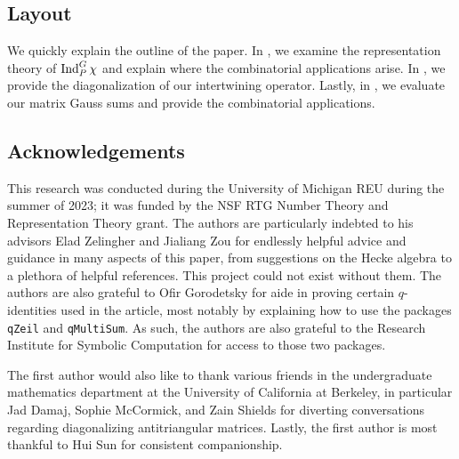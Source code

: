 \documentclass{amsart}
\begin{document}
\subsection{Layout}
We quickly explain the outline of the paper. In , we examine the representation theory of $\operatorname{Ind}_P^G\chi$ and explain where the combinatorial applications arise. In , we provide the diagonalization of our intertwining operator. Lastly, in , we evaluate our matrix Gauss sums and provide the combinatorial applications.

\subsection{Acknowledgements}
This research was conducted during the University of Michigan REU during the summer of 2023; it was funded by the NSF RTG Number Theory and Representation Theory grant. The authors are particularly indebted to his advisors Elad Zelingher and Jialiang Zou for endlessly helpful advice and guidance in many aspects of this paper, from suggestions on the Hecke algebra to a plethora of helpful references. This project could not exist without them. The authors are also grateful to Ofir Gorodetsky for aide in proving certain $q$-identities used in the article, most notably by explaining how to use the packages \texttt{qZeil} and \texttt{qMultiSum}. As such, the authors are also grateful to the Research Institute for Symbolic Computation for access to those two packages.

The first author would also like to thank various friends in the undergraduate mathematics department at the University of California at Berkeley, in particular Jad Damaj, Sophie McCormick, and Zain Shields for diverting conversations regarding diagonalizing antitriangular matrices. Lastly, the first author is most thankful to Hui Sun for consistent companionship.







\printbibliography
\end{document}
